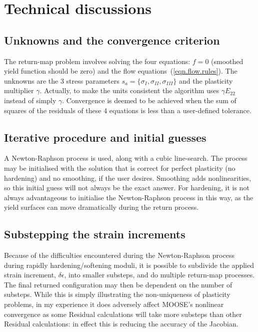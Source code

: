 \documentclass[]{scrreprt}
\newcommand{\ga}{\gamma}
\begin{document}
\chapter{Technical discussions}

\section{Unknowns and the convergence criterion}
The return-map problem involves solving the four equations: $f=0$ (smoothed yield function
should be zero) and the flow equations~(\ref{eqn.flow.rules}).  The
unknowns are the 3 stress parameters $s_{a}=\{\sigma_{I}, \sigma_{II},
\sigma_{III}\}$ and the plasticity multiplier $\ga$.  Actually, to
make the units consistent the algorithm uses $\ga E_{22}$ instead of
simply $\ga$.  Convergence
is deemed to be achieved when the sum of squares of the residuals of
these 4 equations is less than a user-defined tolerance.

\section{Iterative procedure and initial guesses}
A Newton-Raphson process is used, along with a cubic line-search.  The
process may be initialised with the solution that is correct for
perfect plasticity (no hardening) and no smoothing, if the user
desires.  Smoothing adds nonlinearities, so this initial guess will
not always be the exact answer. For hardening, it is not
always advantageous to initialise the Newton-Raphson process in this
way, as the yield surfaces can move dramatically during the return
process.

\section{Substepping the strain increments}
Because of the difficulties encountered during the Newton-Raphson
process during rapidly hardening/softening moduli, it is possible to
subdivide the applied strain increment, $\delta\epsilon$, into smaller
substeps, and do multiple return-map processes.  The final returned configuration may then
be dependent on the number of substeps.  While this is simply
illustrating the non-uniqueness of plasticity problems, in my
experience it does adversely affect MOOSE's nonlinear convergence as
some Residual calculations will take more substeps than other Residual
calculations: in effect this is reducing the accuracy of the Jacobian.
\end{document}
